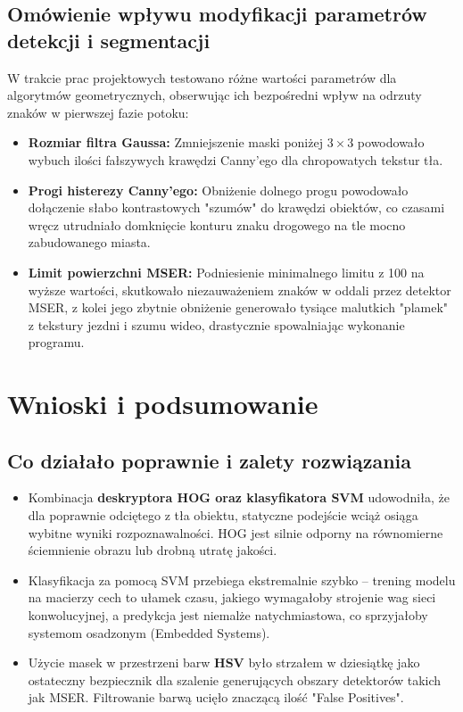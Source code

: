 \documentclass[12pt,a4paper]{article}
\begin{document}
\subsection{Omówienie wpływu modyfikacji parametrów detekcji i segmentacji}
W trakcie prac projektowych testowano różne wartości parametrów dla algorytmów geometrycznych, obserwując ich bezpośredni wpływ na odrzuty znaków w pierwszej fazie potoku:
\begin{itemize}
    \item \textbf{Rozmiar filtra Gaussa:} Zmniejszenie maski poniżej $3\times3$ powodowało wybuch ilości fałszywych krawędzi Canny'ego dla chropowatych tekstur tła.
    \item \textbf{Progi histerezy Canny'ego:} Obniżenie dolnego progu powodowało dołączenie słabo kontrastowych "szumów" do krawędzi obiektów, co czasami wręcz utrudniało domknięcie konturu znaku drogowego na tle mocno zabudowanego miasta.
    \item \textbf{Limit powierzchni MSER:} Podniesienie minimalnego limitu z 100 na wyższe wartości, skutkowało niezauważeniem znaków w oddali przez detektor MSER, z kolei jego zbytnie obniżenie generowało tysiące malutkich "plamek" z tekstury jezdni i szumu wideo, drastycznie spowalniając wykonanie programu.
\end{itemize}


\section{Wnioski i podsumowanie}

\subsection{Co działało poprawnie i zalety rozwiązania}
\begin{itemize}
    \item Kombinacja \textbf{deskryptora HOG oraz klasyfikatora SVM} udowodniła, że dla poprawnie odciętego z tła obiektu, statyczne podejście wciąż osiąga wybitne wyniki rozpoznawalności. HOG jest silnie odporny na równomierne ściemnienie obrazu lub drobną utratę jakości.
    \item Klasyfikacja za pomocą SVM przebiega ekstremalnie szybko -- trening modelu na macierzy cech to ułamek czasu, jakiego wymagałoby strojenie wag sieci konwolucyjnej, a predykcja jest niemalże natychmiastowa, co sprzyjałoby systemom osadzonym (Embedded Systems).
    \item Użycie masek w przestrzeni barw \textbf{HSV} było strzałem w dziesiątkę jako ostateczny bezpiecznik dla szalenie generujących obszary detektorów takich jak MSER. Filtrowanie barwą ucięło znaczącą ilość "False Positives".
\end{itemize}
\end{document}
